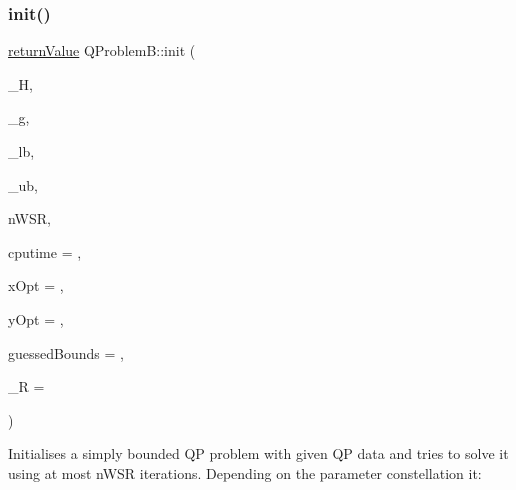 \subsubsection{\texorpdfstring{init()}{init()}\hspace{0.1cm}{\footnotesize\ttfamily [1/3]}}
{\footnotesize\ttfamily \hyperlink{_message_handling_8hpp_a81d556f613bfbabd0b1f9488c0fa865e}{return\+Value} Q\+Problem\+B\+::init (\begin{DoxyParamCaption}\item[{\hyperlink{class_symmetric_matrix}{Symmetric\+Matrix} $\ast$}]{\+\_\+H,  }\item[{const \hyperlink{qp_o_a_s_e_s__wrapper_8h_a0d00e2b3dfadee81331bbb39068570c4}{real\+\_\+t} $\ast$const}]{\+\_\+g,  }\item[{const \hyperlink{qp_o_a_s_e_s__wrapper_8h_a0d00e2b3dfadee81331bbb39068570c4}{real\+\_\+t} $\ast$const}]{\+\_\+lb,  }\item[{const \hyperlink{qp_o_a_s_e_s__wrapper_8h_a0d00e2b3dfadee81331bbb39068570c4}{real\+\_\+t} $\ast$const}]{\+\_\+ub,  }\item[{\hyperlink{_types_8hpp_ab6fd6105e64ed14a0c9281326f05e623}{int\+\_\+t} \&}]{n\+W\+SR,  }\item[{\hyperlink{qp_o_a_s_e_s__wrapper_8h_a0d00e2b3dfadee81331bbb39068570c4}{real\+\_\+t} $\ast$const}]{cputime = {},  }\item[{const \hyperlink{qp_o_a_s_e_s__wrapper_8h_a0d00e2b3dfadee81331bbb39068570c4}{real\+\_\+t} $\ast$const}]{x\+Opt = {},  }\item[{const \hyperlink{qp_o_a_s_e_s__wrapper_8h_a0d00e2b3dfadee81331bbb39068570c4}{real\+\_\+t} $\ast$const}]{y\+Opt = {},  }\item[{const \hyperlink{class_bounds}{Bounds} $\ast$const}]{guessed\+Bounds = {},  }\item[{const \hyperlink{qp_o_a_s_e_s__wrapper_8h_a0d00e2b3dfadee81331bbb39068570c4}{real\+\_\+t} $\ast$const}]{\+\_\+R = {} }\end{DoxyParamCaption})}

Initialises a simply bounded QP problem with given QP data and tries to solve it using at most n\+W\+SR iterations. Depending on the parameter constellation it\+: ~\newline

